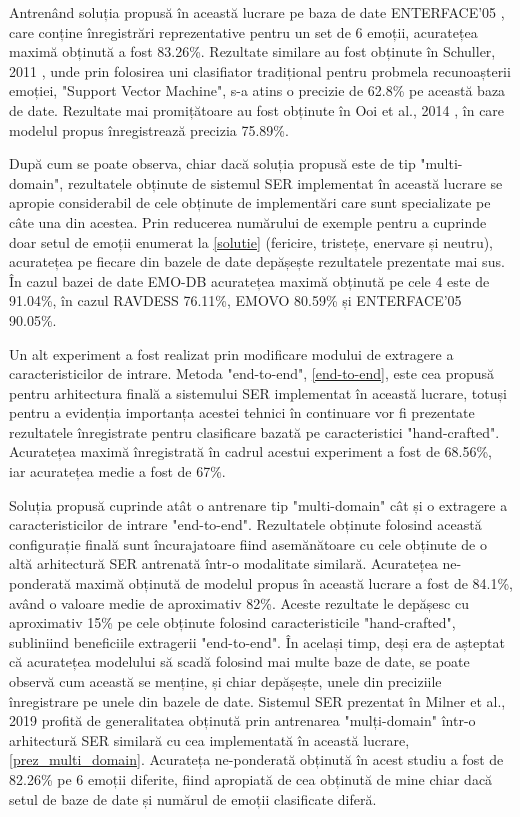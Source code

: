 \documentclass[a4paper,12pt]{book}
\begin{document}
		 Antrenând soluția propusă în această lucrare pe baza de date ENTERFACE'05 \cite{enterface}, care conține înregistrări reprezentative pentru un set de 6 emoții, acuratețea maximă obținută a fost 83.26\%. Rezultate similare au fost obținute în Schuller, 2011 \cite{comp6}, unde prin folosirea uni clasifiator tradițional pentru probmela recunoașterii emoției, "Support Vector Machine", s-a atins o precizie de 62.8\% pe această baza de date. Rezultate mai promițătoare au fost obținute în Ooi et al., 2014 \cite{comp7}, în care modelul propus înregistrează precizia 75.89\%. \par
		 După cum se poate observa, chiar dacă soluția propusă este de tip "multi-domain", rezultatele obținute de sistemul SER implementat în această lucrare se apropie considerabil de cele obținute de implementări care sunt specializate pe câte una din acestea. Prin reducerea numărului de exemple pentru a cuprinde doar setul de emoții enumerat la \ref{solutie} (fericire, tristețe, enervare și neutru), acuratețea pe fiecare din bazele de date depășește rezultatele prezentate mai sus. În cazul bazei de date EMO-DB acuratețea maximă obținută pe cele 4 este de 91.04\%, în cazul RAVDESS 76.11\%, EMOVO 80.59\% și ENTERFACE'05 90.05\%.  
		 
		 \par		 
		 Un alt experiment a fost realizat prin modificare modului de extragere a caracteristicilor de intrare. Metoda "end-to-end", \ref{end-to-end}, este cea propusă pentru arhitectura finală a sistemului SER implementat în această lucrare, totuși pentru a evidenția importanța acestei tehnici în continuare vor fi prezentate rezultatele înregistrate pentru clasificare bazată pe caracteristici "hand-crafted". Acuratețea maximă înregistrată în cadrul acestui experiment a fost de 68.56\%, iar acuratețea medie a fost de 67\%.
		 
		 \par
		 Soluția propusă cuprinde atât o antrenare tip "multi-domain" cât și o extragere a caracteristicilor de intrare "end-to-end". Rezultatele obținute folosind această configurație finală sunt încurajatoare fiind asemănătoare cu cele obținute de o altă arhitectură SER antrenată într-o modalitate similară. Acuratețea ne-ponderată maximă obținută de modelul propus în această lucrare a fost de 84.1\%, având o valoare medie de aproximativ 82\%. Aceste rezultate le depășesc cu aproximativ 15\% pe cele obținute folosind caracteristicile "hand-crafted", subliniind beneficiile extragerii "end-to-end". În același timp, deși era de așteptat că acuratețea modelului să scadă folosind mai multe baze de date, se poate observă cum această se menține, și chiar depășește, unele din preciziile înregistrare pe unele din bazele de date. Sistemul SER prezentat în Milner et al., 2019 \cite{multi-domain} profită de generalitatea obținută prin antrenarea "mulți-domain" într-o arhitectură SER similară cu cea implementată în această lucrare, \ref{prez_multi_domain}. Acurateța ne-ponderată obținută în acest studiu a fost de 82.26\% pe 6 emoții diferite, fiind apropiată de cea obținută de mine chiar dacă setul de baze de date și numărul de emoții clasificate diferă. \par		 
		 
\end{document}
